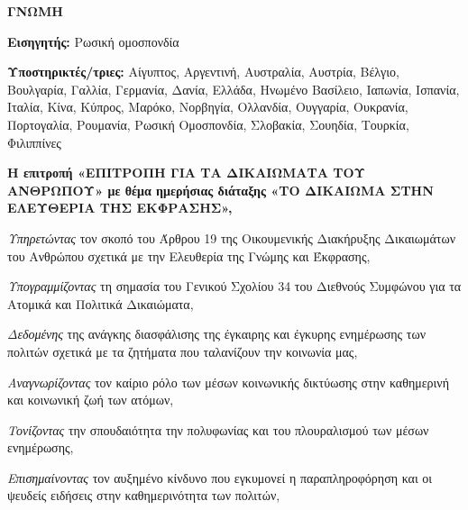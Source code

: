 \documentclass[12pt, letterpaper]{article}
\begin{document}
\pagestyle{fancy}
\fancyfoot{}
\renewcommand{\headrulewidth}{0pt}
\normalsize


\textbf{ΓΝΩΜΗ}

\textbf{Εισηγητής:} Ρωσική ομοσπονδία

\textbf{Υποστηρικτές/τριες:} Αίγυπτος, Αργεντινή, Αυστραλία, Αυστρία, Βέλγιο, Βουλγαρία, Γαλλία, Γερμανία, Δανία, Ελλάδα, Ηνωμένο Βασίλειο, Ιαπωνία, Ισπανία, Ιταλία, Κίνα, Κύπρος, Μαρόκο, Νορβηγία, Ολλανδία, Ουγγαρία, Ουκρανία, Πορτογαλία, Ρουμανία, Ρωσική Ομοσπονδία, Σλοβακία, Σουηδία, Τουρκία, Φιλιππίνες

\textbf{Η επιτροπή «ΕΠΙΤΡΟΠΗ ΓΙΑ ΤΑ ΔΙΚΑΙΩΜΑΤΑ ΤΟΥ ΑΝΘΡΩΠΟΥ» με θέμα ημερήσιας διάταξης «ΤΟ ΔΙΚΑΙΩΜΑ ΣΤΗΝ ΕΛΕΥΘΕΡΙΑ ΤΗΣ ΕΚΦΡΑΣΗΣ»,}

\textit{Υπηρετώντας} τον σκοπό του Άρθρου 19 της Οικουμενικής Διακήρυξης Δικαιωμάτων του Ανθρώπου σχετικά με την Ελευθερία της Γνώμης και Έκφρασης,

\textit{Υπογραμμίζοντας} τη σημασία του Γενικού Σχολίου 34 του Διεθνούς Συμφώνου για τα Ατομικά και Πολιτικά Δικαιώματα,

\textit{Δεδομένης} της ανάγκης διασφάλισης της έγκαιρης και έγκυρης ενημέρωσης των πολιτών σχετικά με τα ζητήματα που ταλανίζουν την κοινωνία μας,

\textit{Αναγνωρίζοντας} τον καίριο ρόλο των μέσων κοινωνικής δικτύωσης στην καθημερινή και κοινωνική ζωή των ατόμων,

\textit{Τονίζοντας} την σπουδαιότητα την πολυφωνίας και του πλουραλισμού των μέσων ενημέρωσης,

\textit{Επισημαίνοντας} τον αυξημένο κίνδυνο που εγκυμονεί η παραπληροφόρηση και οι ψευδείς ειδήσεις στην καθημερινότητα των πολιτών,
\end{document}
